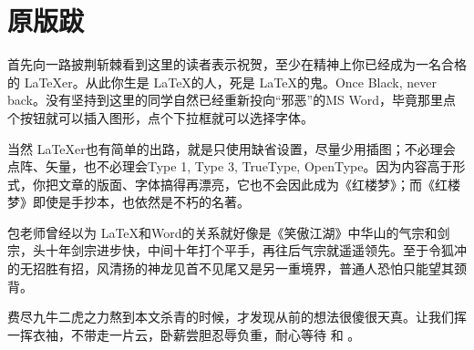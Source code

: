 \chapter{原版跋}

首先向一路披荆斩棘看到这里的读者表示祝贺，至少在精神上你已经成为一名合格的 \LaTeX{}er。从此你生是 \LaTeX 的人，死是 \LaTeX 的鬼。Once Black, never back。没有坚持到这里的同学自然已经重新投向“邪恶”的MS Word，毕竟那里点个按钮就可以插入图形，点个下拉框就可以选择字体。

当然 \LaTeX{}er也有简单的出路，就是只使用缺省设置，尽量少用插图；不必理会点阵、矢量，也不必理会Type 1, Type 3, TrueType, OpenType。因为内容高于形式，你把文章的版面、字体搞得再漂亮，它也不会因此成为《红楼梦》；而《红楼梦》即使是手抄本，也依然是不朽的名著。

包老师曾经以为 \LaTeX 和Word的关系就好像是《笑傲江湖》中华山的气宗和剑宗，头十年剑宗进步快，中间十年打个平手，再往后气宗就遥遥领先。至于令狐冲的无招胜有招，风清扬的神龙见首不见尾又是另一重境界，普通人恐怕只能望其颈背。

费尽九牛二虎之力熬到本文杀青的时候，才发现从前的想法很傻很天真。让我们挥一挥衣袖，不带走一片云，卧薪尝胆忍辱负重，耐心等待 \XeTeX 和 \LuaTeX。